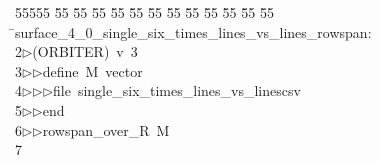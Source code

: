 %
%
\begin{tabbing}
55555 \= 55 \= 55 \= 55 \= 55 \= 55 \= 55 \= 55 \= 55 \= 55 \= 55 \= 55 \= 55 \= \>surface\_4\_0\_single\_six\_times\_lines\_vs\_lines\_rowspan:\\[0pt]
2\>$\triangleright$\>(ORBITER)\ v\ 3\ \\[0pt]
3\>$\triangleright$\>$\triangleright$\>define\ M\ vector\ \\[0pt]
4\>$\triangleright$\>$\triangleright$\>$\triangleright$\>file\ single\_six\_times\_lines\_vs\_linescsv\ \\[0pt]
5\>$\triangleright$\>$\triangleright$\>end\ \\[0pt]
6\>$\triangleright$\>$\triangleright$\>rowspan\_over\_R\ M\\[0pt]
7\>\end{tabbing}
